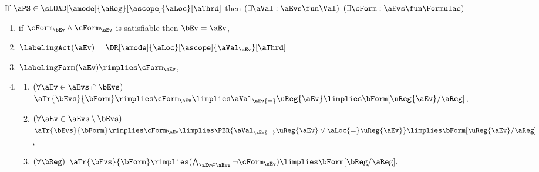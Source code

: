 \medskip
If $\aPS \in \sLOAD[\amode]{\aReg}[\ascope]{\aLoc}[\aThrd]$ then
$(\exists\aVal:\aEvs\fun\Val)$
$(\exists\cForm:\aEvs\fun\Formulae)$
\begin{enumerate}[topsep=0pt,label=(\textsc{r}\arabic*),ref=\textsc{r}\arabic*]
\item \label{read-x-E}
  if $\cForm_\bEv\land\cForm_\aEv$ is satisfiable then $\bEv=\aEv$,
\item \label{read-x-lambda}
  $\labelingAct(\aEv) = \DR[\amode]{\aLoc}[\ascope]{\aVal_\aEv}[\aThrd]$
\item \label{read-x-kappa}
  \begin{math}
    \labelingForm(\aEv) \rimplies
    \cForm_\aEv
  \end{math},
  
\item[] \label{read-tau}
  \begin{enumerate}[leftmargin=0pt]
  \item \label{read-x-tau-dependent}
    \begin{math}
      (\forall\aEv\in\aEvs\cap\bEvs)
    \end{math}
    \begin{math}
      \aTr{\bEvs}{\bForm} \rimplies
      \cForm_\aEv
      \limplies \aVal_\aEv{=}\uReg{\aEv}
      \limplies \bForm[\uReg{\aEv}/\aReg]
    \end{math},
    
  \item \label{read-x-tau-independent}
    \begin{math}
      (\forall\aEv\in\aEvs\setminus\bEvs)
    \end{math}
    \begin{math}
      \aTr{\bEvs}{\bForm} \rimplies
      \cForm_\aEv 
      \limplies
      \PBR{\aVal_\aEv{=}\uReg{\aEv} \lor \aLoc{=}\uReg{\aEv}}
      \limplies
      \bForm[\uReg{\aEv}/\aReg]
    \end{math},
    
  \item \label{read-x-tau-empty}
    \begin{math}
      (\forall\bReg)
    \end{math}
    \begin{math}
      \aTr{\bEvs}{\bForm} \rimplies 
      (\bigwedge_{\aEv\in\aEvs}\lnot\cForm_\aEv)
      \limplies 
      \bForm[\bReg/\aReg].
    \end{math}  
  \end{enumerate}  
\end{enumerate}
\medskip

